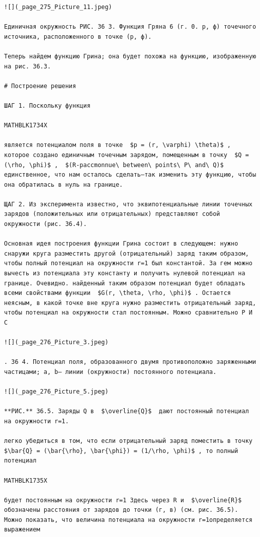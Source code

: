 \documentclass[
]{article}
\begin{document}
\begin{verbatim}
![](_page_275_Picture_11.jpeg)

Единичная окружность РИС. 36 3. Функция Гряна 6 (г. 0. р, ф) точечного источника, расположенного в точке (р, ф).

Теперь найдем функцию Грина; она будет похожа на функцию, изображенную на рис. 36.3.

# Построение решения

ШАГ 1. Поскольку функция

MATHBLK1734X

является потенциалом поля в точке  $p = (r, \varphi) \theta)$ , которое создано единичным точечным зарядом, помещенным в точку  $Q = (\rho, \phi)$ ,  $(R-paccmonnue\ between\ points\ P\ and\ Q)$  единственное, что нам осталось сделать—так изменить эту функцию, чтобы она обратилась в нуль на границе.

ЩАГ 2. Из эксперимента известно, что эквипотенциальные линии точечных зарядов (положительных или отрицательных) представляют собой окружности (рис. 36.4).

Основная идея построения функции Грина состоит в следующем: нужно снаружи круга разместить другой (отрицательный) заряд таким образом, чтобы полный потенциал на окружности r=1 был константой. За гем можно вычесть из потенциала эту константу и получить нулевой потенциал на границе. Очевидно. найденный таким образом потенциал будет обладать всеми свойствами функции  $G(r, \theta, \rho, \phi)$ . Остается неясным, в какой точке вне круга нужно разместить отрицательный заряд, чтобы потенциал на окружности стал постоянным. Можно сравнительно Р И С

![](_page_276_Picture_3.jpeg)

. 36 4. Потенциал поля, образованного двумя противоположно заряженными частицами; a, b— линии (окружности) постоянного потенциала.

![](_page_276_Picture_5.jpeg)

**РИС.** 36.5. Заряды Q в  $\overline{Q}$  дают постоянный потенциал на окружности r=1.

легко убедиться в том, что если отрицательный заряд поместить в точку  $\bar{Q} = (\bar{\rho}, \bar{\phi}) = (1/\rho, \phi)$ , то полный потенциал

MATHBLK1735X

будет постоянным на окружности r=1 Здесь через R и  $\overline{R}$  обозначены расстояния от зарядов до точки (г, в) (см. рис. 36.5). Можно показать, что величина потенциала на окружности r=1определяется выражением


\end{verbatim}
\end{document}
